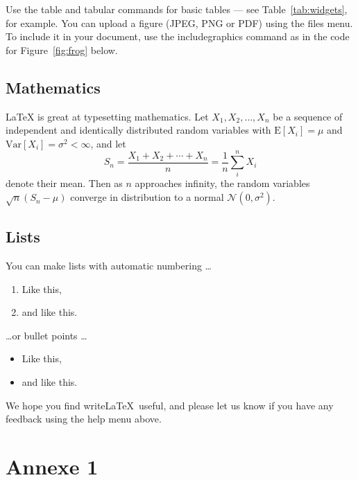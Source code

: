 Use the table and tabular commands for basic tables --- see Table~\ref{tab:widgets}, for example. You can upload a figure (JPEG, PNG or PDF) using the files menu. To include it in your document, use the includegraphics command as in the code for Figure~\ref{fig:frog} below.



\subsection{Mathematics}

\LaTeX{} is great at typesetting mathematics. Let $X_1, X_2, \ldots, X_n$ be a sequence of independent and identically distributed random variables with $\text{E}[X_i] = \mu$ and $\text{Var}[X_i] = \sigma^2 < \infty$, and let
$$S_n = \frac{X_1 + X_2 + \cdots + X_n}{n}
      = \frac{1}{n}\sum_{i}^{n} X_i$$
denote their mean. Then as $n$ approaches infinity, the random variables $\sqrt{n}(S_n - \mu)$ converge in distribution to a normal $\mathcal{N}(0, \sigma^2)$.

\subsection{Lists}

You can make lists with automatic numbering \dots

\begin{enumerate}
\item Like this,
\item and like this.
\end{enumerate}
\dots or bullet points \dots
\begin{itemize}
\item Like this,
\item and like this.
\end{itemize}

We hope you find write\LaTeX\ useful, and please let us know if you have any feedback using the help menu above.

\appendix
\section{Annexe 1}
\label{sec:Annexe 1}



